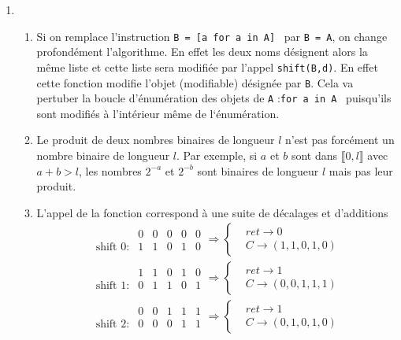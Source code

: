 \begin{enumerate}
\item
\begin{enumerate}
  \item Si on remplace l'instruction \og\texttt{B = [a for a in A]}\fg~ par \og\texttt{B = A}\fg, on change profondément l'algorithme. En effet les deux noms désignent alors la même liste et cette liste sera modifiée par l'appel \texttt{shift(B,d)}. En effet cette fonction modifie l'objet (modifiable) désignée par \texttt{B}. Cela va pertuber la boucle d'énumération des objets de \texttt{A} :\og \texttt{for a in A}\fg~ puisqu'ils sont modifiés à l'intérieur même de l`énumération.
  
  \item Le produit de deux nombres binaires de longueur $l$ n'est pas forcément un nombre binaire de longueur $l$. Par exemple, si $a$ et $b$ sont dans $\llbracket 0,l \rrbracket$ avec $a+b >l$, les nombres $2^{-a}$ et $2^{-b}$ sont binaires de longueur $l$ mais pas leur produit.
  
  \item L'appel de la fonction correspond à une suite de décalages et d'additions
\begin{align*}
\begin{array}{clllll}
                &0 & 0 & 0 & 0 & 0\\
\text{shift 0}: &1 & 1 & 0 & 1 & 0
\end{array}
\Rightarrow 
\left\lbrace
\begin{aligned}
&ret \rightarrow 0 \\ &C \rightarrow (1,1,0,1,0)  
\end{aligned}
\right. \\
\begin{array}{clllll}
                &1 & 1 & 0 & 1 & 0\\
\text{shift 1}: &0 & 1 & 1 & 0 & 1
\end{array}
\Rightarrow 
\left\lbrace
\begin{aligned}
&ret \rightarrow 1 \\ &C \rightarrow (0,0,1,1,1)  
\end{aligned}
\right. \\
\begin{array}{clllll}
                &0 & 0 & 1 & 1 & 1\\
\text{shift 2}: &0 & 0 & 0 & 1 & 1
\end{array}
\Rightarrow 
\left\lbrace
\begin{aligned}
&ret \rightarrow 1 \\ &C \rightarrow (0,1,0,1,0)  
\end{aligned}
\right. 
\end{align*}


\end{enumerate}
\end{enumerate}
